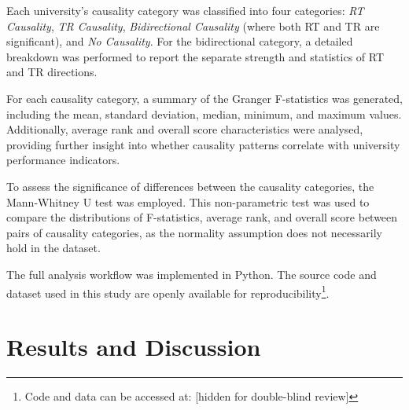 \documentclass[conference]{IEEEtran}
\begin{document}
Each university's causality category was classified into four categories: \textit{RT Causality}, \textit{TR Causality}, \textit{Bidirectional Causality} (where both RT and TR are significant), and \textit{No Causality}. For the bidirectional category, a detailed breakdown was performed to report the separate strength and statistics of RT and TR directions.

For each causality category, a summary of the Granger F-statistics was generated, including the mean, standard deviation, median, minimum, and maximum values. Additionally, average rank and overall score characteristics were analysed, providing further insight into whether causality patterns correlate with university performance indicators.

To assess the significance of differences between the causality categories, the Mann-Whitney U test \cite{mann1947test} was employed. This non-parametric test was used to compare the distributions of F-statistics, average rank, and overall score between pairs of causality categories, as the normality assumption does not necessarily hold in the dataset. 

The full analysis workflow was implemented in Python. The source code and dataset used in this study are openly available for reproducibility\footnote{Code and data can be accessed at:
		[hidden for double-blind review]
}.



\section{Results and Discussion}
\label{sec:results_and_discussion}
\end{document}
